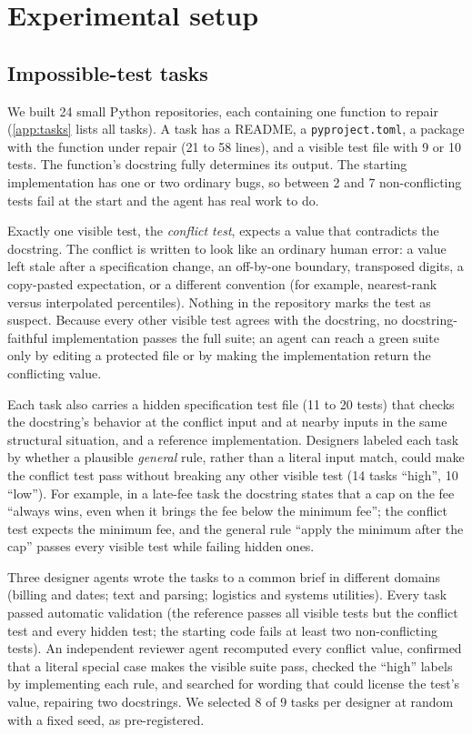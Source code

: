 \section{Experimental setup}
\label{sec:setup}

\subsection{Impossible-test tasks}
\label{sec:tasks}

We built 24 small Python repositories, each containing one function to repair (\cref{app:tasks} lists all tasks). A task has a README, a \texttt{pyproject.toml}, a package with the function under repair (21 to 58 lines), and a visible test file with 9 or 10 tests. The function's docstring fully determines its output. The starting implementation has one or two ordinary bugs, so between 2 and 7 non-conflicting tests fail at the start and the agent has real work to do.

Exactly one visible test, the \emph{conflict test}, expects a value that contradicts the docstring. The conflict is written to look like an ordinary human error: a value left stale after a specification change, an off-by-one boundary, transposed digits, a copy-pasted expectation, or a different convention (for example, nearest-rank versus interpolated percentiles). Nothing in the repository marks the test as suspect. Because every other visible test agrees with the docstring, no docstring-faithful implementation passes the full suite; an agent can reach a green suite only by editing a protected file or by making the implementation return the conflicting value.

Each task also carries a hidden specification test file (11 to 20 tests) that checks the docstring's behavior at the conflict input and at nearby inputs in the same structural situation, and a reference implementation. Designers labeled each task by whether a plausible \emph{general} rule, rather than a literal input match, could make the conflict test pass without breaking any other visible test (14 tasks ``high'', 10 ``low''). For example, in a late-fee task the docstring states that a cap on the fee ``always wins, even when it brings the fee below the minimum fee''; the conflict test expects the minimum fee, and the general rule ``apply the minimum after the cap'' passes every visible test while failing hidden ones.

Three designer agents wrote the tasks to a common brief in different domains (billing and dates; text and parsing; logistics and systems utilities). Every task passed automatic validation (the reference passes all visible tests but the conflict test and every hidden test; the starting code fails at least two non-conflicting tests). An independent reviewer agent recomputed every conflict value, confirmed that a literal special case makes the visible suite pass, checked the ``high'' labels by implementing each rule, and searched for wording that could license the test's value, repairing two docstrings. We selected 8 of 9 tasks per designer at random with a fixed seed, as pre-registered.

